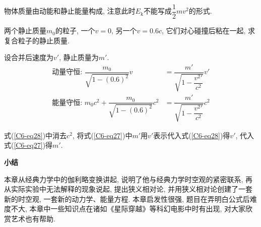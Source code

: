 物体质量由动能和静止能量构成, 注意此时$E_{\textrm{k}}$不能写成$\dfrac{1}{2}mv^2$的形式. 

\vskip 0.3cm

\begin{example}
	两个静止质量$m_0$的粒子, 一个$v=0$, 另一个$v=0.6c$, 它们对心碰撞后粘在一起, 求复合粒子的静止质量. 
	\begin{solution}
		
		设合并后速度为$v'$, 静止质量为$m'$. 
		\begin{align}
			\text{动量守恒:~} \dfrac{m_0}{\sqrt{1-{(0.6)^2}}} v &= \dfrac{m'}{\sqrt{1-\dfrac{{v^2}'}{{c^2}}}} v' \label{C6-eq27} \\
			\text{能量守恒:~} m_0 {c^2} + \dfrac{m_0}{\sqrt{1-{(0.6)^2}}} {c^2} &= \dfrac{m'}{\sqrt{1 - \dfrac{{v^2}'}{{c^2}}}} {c^2} \label{C6-eq28}
		\end{align}
		
		式(\ref{C6-eq28})中消去$c^2$, 将式(\ref{C6-eq27})中$m'$用$v'$表示代入式(\ref{C6-eq28})得$v'$, 代入式(\ref{C6-eq27})得$m'$. 
		
	\end{solution}
	
\end{example}

\begin{center}
	\textcolor[RGB]{18,29,57}{\textbf{小结}}
\end{center}

本章从经典力学中的伽利略变换讲起, 说明了他与经典力学时空观的紧密联系, 再从实际实验中无法解释的现象说起, 提出狭义相对论, 并用狭义相对论创建了一套新的时空观, 一套新的动力学、能量方程. 
本章启发性很强, 题目在弄明白公式后难度不大, 本章中一些知识点在诸如《星际穿越》等科幻电影中时有出现, 对大家欣赏艺术也有帮助. 


